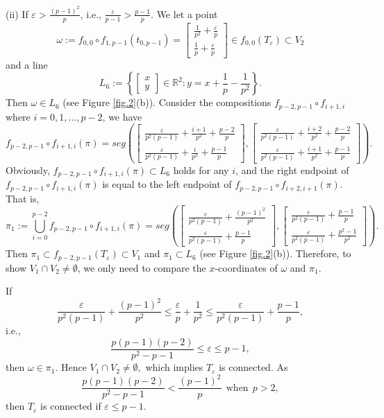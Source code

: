 \documentclass[12pt, reqno]{amsart}
\numberwithin{equation}{section}
\begin{document}
(ii) If $\varepsilon>\frac{(p-1)^{2}}{p}$, i.e., $\frac{\varepsilon}{p-1}>\frac{p-1}{p}$.  We let a point
$$\omega:=f_{0,0}\circ f_{1,p-1}(t_{0,p-1})=\left[\begin{array}{c}\frac1{p^2}+\frac{\varepsilon}p\\\frac1p+\frac{\varepsilon}p\end{array}\right]\in f_{0,0}(T_{\varepsilon})\subset V_{2}$$ and a line
$$L_{6}:=\left\{\left[\begin{array}{c}x\\y\end{array}\right]\in\mathbb{R}^{2}: y=x+\frac{1}{p}-\frac{1}{p^2}\right\}.$$
Then $\omega\in L_6$ (see Figure \ref{fig.2}(b)).  Consider the compositions $f_{p-2,p-1}\circ f_{i+1,i}$ where $i=0,1,\dots,p-2$, we have
$$f_{p-2,p-1}\circ f_{i+1,i}(\pi)
=seg\left(\left[\begin{array}{c}\frac{\varepsilon}{p^2(p-1)}+\frac{i+1}{p^2}+\frac{p-2}{p}\\ \frac{\varepsilon}{p^2(p-1)}+\frac{i}{p^2}+\frac{p-1}{p}\end{array}\right],\left[\begin{array}{c} \frac{\varepsilon}{p^2(p-1)}+\frac{i+2}{p^2}+\frac{p-2}{p}\\ \frac{\varepsilon}{p^2(p-1)}+\frac{i+1}{p^2}+\frac{p-1}{p}\end{array}\right]\right).$$
Obviously, $f_{p-2,p-1}\circ f_{i+1,i}(\pi)\subset L_{6}$ holds for any $i$, and the right endpoint  of $f_{p-2,p-1}\circ f_{i+1,i}(\pi)$ is equal to the left endpoint of $f_{p-2,p-1}\circ f_{i+2,i+1}(\pi)$. That is,
$$\pi_{1}:=\bigcup^{p-2}_{i=0}f_{p-2,p-1}\circ f_{i+1,i}(\pi)
=seg\left(\left[\begin{array}{c}\frac{\varepsilon}{p^2(p-1)}+\frac{(p-1)^2}{p^2}\\ \frac{\varepsilon}{p^2(p-1)}+\frac{p-1}{p}\end{array}\right],\left[\begin{array}{c} \frac{\varepsilon}{p^2(p-1)}+\frac{p-1}{p}\\ \frac{\varepsilon}{p^2(p-1)}+\frac{p^2-1}{p^2}\end{array}\right]\right).$$
Then  $\pi_{1}\subset f_{p-2,p-1}(T_{\varepsilon})\subset V_{1}$ and $\pi_1\subset L_{6}$ (see Figure \ref{fig.2}(b)). Therefore, to show $V_1\cap V_2\ne\emptyset$, we only need to compare the $x$-coordinates of $\omega$ and  $\pi_{1}$.


If
$$\frac{\varepsilon}{p^2(p-1)}+\frac{(p-1)^2}{p^2}\leq\frac{\varepsilon}{p}+\frac{1}{p^2}\leq\frac{\varepsilon}{p^2(p-1)}+\frac{p-1}{p},$$
i.e., $$ \frac{p(p-1)(p-2)}{p^2-p-1}\leq\varepsilon\leq p-1,$$
then  $\omega\in\pi_{1}$. Hence  $V_{1}\cap V_{2}\neq\emptyset,$ which implies $T_{\varepsilon}$ is connected.  As $$\frac{p(p-1)(p-2)}{p^2-p-1}<\frac{(p-1)^2}{p} \ \ \text{when} \  \  p>2,$$ then $T_{\varepsilon}$ is connected if $\varepsilon\leq p-1$.
\end{document}
